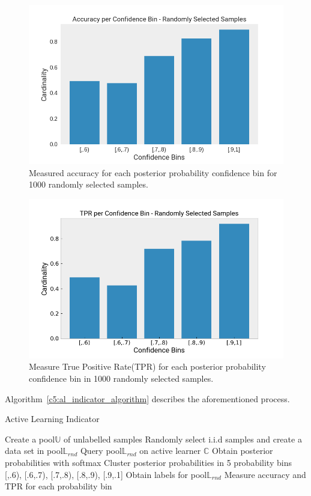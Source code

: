 \begin{figure}[ht!]
    \centering  
    \includegraphics[width=.45\textwidth]{figures/chap5/al/indicators/acc/pred_conf_acc_random_1000}
    \caption{Measured accuracy for each posterior probability confidence bin for 1000 randomly selected samples.}
    \label{c5:random_indicator_bins_accuracy}
\end{figure}

\begin{figure}[ht!]
    \centering  
    \includegraphics[width=.45\textwidth]{figures/chap5/al/indicators/tpr/pred_conf_tpr_random_1000}
    \caption{Measure True Positive Rate(TPR) for each posterior probability confidence bin in 1000 randomly selected samples.}
    \label{c5:random_indicator_bins_tpr}
\end{figure}

Algorithm~\ref{c5:al_indicator_algorithm} describes the aforementioned process.

\begin{algorithm}
\caption{Active Learning Indicator}
\label{c5:al_indicator_algorithm}
\begin{algorithmic}[1]
    \State Create a pool$\mathbb{U}$ of unlabelled samples
    \State Randomly select i.i.d samples and create a data set in pool$\mathbb{L}_{rnd}$
    \State Query pool$\mathbb{L}_{rnd}$ on active learner $\mathbb{C}$
    \State Obtain posterior probabilities with softmax
    \State Cluster posterior probabilities in 5 probability bins [,.6), [.6,.7), [.7,.8), [.8,.9), [.9,.1]
    \State Obtain labels for pool$\mathbb{L}_{rnd}$
    \State Measure accuracy and TPR for each probability bin
\EndProcedure
\end{algorithmic}
\end{algorithm}



